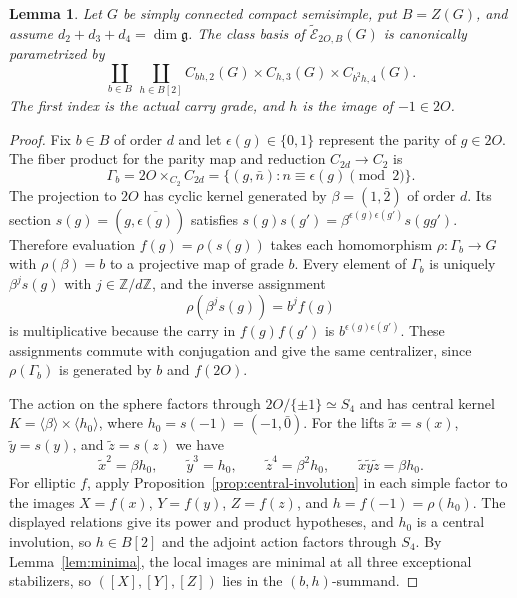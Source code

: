 \documentclass[11pt,a4paper,reqno]{amsart}
\theoremstyle{plain}
\newtheorem{lemma}[theorem]{Lemma}
\theoremstyle{definition}
\theoremstyle{remark}
\numberwithin{equation}{section}
\newcommand{\ZZ}{\mathbb Z}
\newcommand{\fg}{\mathfrak g}
\newcommand{\wtE}{\widetilde{\mathcal E}}
\begin{document}
\begin{lemma}\label{lem:octahedral-local-model}
Let $G$ be simply connected compact semisimple, put $B=Z(G)$, and assume $d_2+d_3+d_4=\dim\fg$. The class basis of $\wtE_{2O,B}(G)$ is canonically parametrized by
\begin{equation}\label{eq:octahedral-local-model}
\coprod_{b\in B}\ \coprod_{h\in B[2]}
C_{bh,2}(G)\times C_{h,3}(G)\times C_{b^2h,4}(G).
\end{equation}
The first index is the actual carry grade, and $h$ is the image of $-1\in2O$.
\end{lemma}
\begin{proof}
Fix $b\in B$ of order $d$ and let $\epsilon(g)\in\{0,1\}$ represent the parity of $g\in2O$. The fiber product for the parity map and reduction $C_{2d}\to C_2$ is
\[
\Gamma_b=2O\times_{C_2}C_{2d}
=\{(g,\bar n):n\equiv\epsilon(g)\pmod 2\}.
\]
The projection to $2O$ has cyclic kernel generated by $\beta=(1,\bar 2)$ of order $d$. Its section $s(g)=(g,\overline{\epsilon(g)})$ satisfies $s(g)s(g')=\beta^{\epsilon(g)\epsilon(g')}s(gg')$. Therefore evaluation $f(g)=\rho(s(g))$ takes each homomorphism $\rho\colon\Gamma_b\to G$ with $\rho(\beta)=b$ to a projective map of grade $b$. Every element of $\Gamma_b$ is uniquely $\beta^j s(g)$ with $j\in\ZZ/d\ZZ$, and the inverse assignment
\[
\rho(\beta^j s(g))=b^j f(g)
\]
is multiplicative because the carry in $f(g)f(g')$ is $b^{\epsilon(g)\epsilon(g')}$. These assignments commute with conjugation and give the same centralizer, since $\rho(\Gamma_b)$ is generated by $b$ and $f(2O)$.

The action on the sphere factors through $2O/\{\pm1\}\simeq S_4$ and has central kernel $K=\langle\beta\rangle\times\langle h_0\rangle$, where $h_0=s(-1)=(-1,\bar0)$. For the lifts $\widetilde x=s(x)$, $\widetilde y=s(y)$, and $\widetilde z=s(z)$ we have
\[
\widetilde x^2=\beta h_0,\qquad \widetilde y^3=h_0,\qquad
\widetilde z^4=\beta^2h_0,\qquad \widetilde x\widetilde y\widetilde z=\beta h_0.
\]
For elliptic $f$, apply Proposition~\ref{prop:central-involution} in each simple factor to the images $X=f(x)$, $Y=f(y)$, $Z=f(z)$, and $h=f(-1)=\rho(h_0)$. The displayed relations give its power and product hypotheses, and $h_0$ is a central involution, so $h\in B[2]$ and the adjoint action factors through $S_4$. By Lemma~\ref{lem:minima}, the local images are minimal at all three exceptional stabilizers, so $([X],[Y],[Z])$ lies in the $(b,h)$-summand.


\end{proof}
\end{document}
